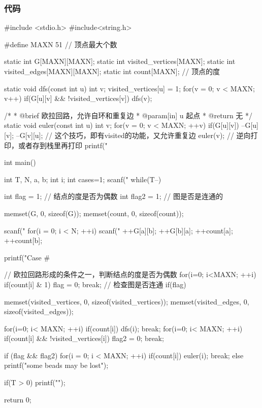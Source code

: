 \subsubsection{代码}
\begin{Codex}[label=eulerian_circuit.c]
#include <stdio.h>
#include<string.h>

#define MAXN 51  // 顶点最大个数

static int G[MAXN][MAXN];
static int visited_vertices[MAXN]; 
static int visited_edges[MAXN][MAXN];
static int count[MAXN]; // 顶点的度

static void dfs(const int u) {  
    int v;
    visited_vertices[u] = 1;
    for(v = 0;  v < MAXN; v++) if(G[u][v] && !visited_vertices[v]) {
        dfs(v);
    }
}

/*
 * @brief 欧拉回路，允许自环和重复边
 * @param[in] u 起点
 * @return 无
 */
static void euler(const int u){
    int v;
    for(v = 0; v < MAXN; ++v) if(G[u][v]){
        --G[u][v]; --G[v][u]; // 这个技巧，即有visited的功能，又允许重复边
        euler(v);
        // 逆向打印，或者存到栈里再打印
        printf("%
    }
}

int main() {
    int T, N, a, b;
    int i;
    int cases=1;
    scanf("%
    while(T--) {
        int flag = 1; // 结点的度是否为偶数
        int flag2 = 1; // 图是否是连通的
        
        memset(G, 0, sizeof(G));
        memset(count, 0, sizeof(count));

        scanf("%
        for(i = 0; i < N; ++i){
            scanf("%
            ++G[a][b];
            ++G[b][a];
            ++count[a];
            ++count[b];
        }

        printf("Case #%

        // 欧拉回路形成的条件之一，判断结点的度是否为偶数
        for(i=0; i<MAXN; ++i) {
            if(count[i] & 1){
                flag = 0;
                break;
            }
        }
        // 检查图是否连通
        if(flag) {
            memset(visited_vertices, 0, sizeof(visited_vertices));
            memset(visited_edges, 0, sizeof(visited_edges));

            for(i=0; i< MAXN; ++i) 
                if(count[i]) { 
                    dfs(i);
                    break; 
                }
            for(i=0; i< MAXN; ++i){
                if(count[i] && !visited_vertices[i]) {
                    flag2 = 0; 
                    break;
                }
            }
        }
        if (flag && flag2) {
            for(i = 0; i < MAXN; ++i) if(count[i]){
                euler(i);
                break;
            }
        } else {
            printf("some beads may be lost\n");
        }

        if(T > 0) printf("\n");
    }
    return 0;
}
\end{Codex}


